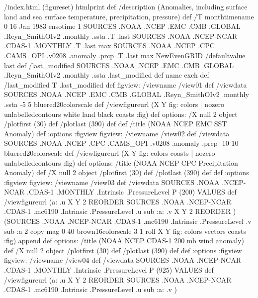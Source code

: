 \begin{ingrid}
/index.html {(figureset) htmlprint} def
/description (Anomalies, including surface land and sea surface temperature, precipitation, pressure) def
/T 
monthtimename
0
16 Jan 1983 ensotime
1
SOURCES .NOAA .NCEP .EMC .CMB .GLOBAL .Reyn_SmithOIv2 .monthly .ssta
.T .last
SOURCES .NOAA .NCEP-NCAR .CDAS-1 .MONTHLY .T .last
max
SOURCES .NOAA .NCEP .CPC .CAMS_OPI .v0208 .anomaly .prcp .T .last
max
NewEvenGRID
/defaultvalue last def
/last_modified
SOURCES .NOAA .NCEP .EMC .CMB .GLOBAL .Reyn_SmithOIv2 .monthly .ssta
.last_modified def
name exch def
/last_modified T .last_modified def
figview:
/viewname /view01 def
/viewdata SOURCES .NOAA .NCEP .EMC .CMB .GLOBAL .Reyn_SmithOIv2 .monthly .ssta
-5 5 bluered20colorscale
def
/viewfigureurl (X Y fig: colors | nozero unlabelledcontours white land black coasts :fig) def
options:
/X null 2 object
/plotfirst (30) def
/plotlast (390) def
def
/title (NOAA NCEP EMC SST Anomaly) def
:options
:figview
figview:
/viewname /view02 def
/viewdata 
SOURCES .NOAA .NCEP .CPC .CAMS_OPI .v0208 .anomaly .prcp
-10 10 bluered20colorscale
  def
/viewfigureurl (X Y fig: colors coasts | nozero unlabelledcontours :fig) def
options:
/title (NOAA NCEP CPC Precipitation Anomaly) def
/X null 2 object
/plotfirst (30) def
/plotlast (390) def
def
:options
:figview
figview:
/viewname /view03 def
/viewdata  SOURCES .NOAA .NCEP-NCAR .CDAS-1 .MONTHLY .Intrinsic .PressureLevel
  P (200) VALUES
  def
/viewfigureurl (a: .u X Y 2 REORDER SOURCES .NOAA .NCEP-NCAR .CDAS-1 .mc6190 .Intrinsic .PressureLevel .u sub :a: .v X Y 2 REORDER )
(SOURCES .NOAA .NCEP-NCAR .CDAS-1 .mc6190 .Intrinsic .PressureLevel .v sub :a 2 copy  mag 0 40 brown16colorscale 3 1 roll X Y fig: colors vectors coasts :fig) append def
options:
/title (NOAA NCEP CDAS-1 200 mb wind anomaly) def
/X null 2 object
/plotfirst (30) def
/plotlast (390) def
def
:options
:figview
figview:
/viewname /view04 def
/viewdata  SOURCES .NOAA .NCEP-NCAR .CDAS-1 .MONTHLY .Intrinsic .PressureLevel
  P (925) VALUES
  def
/viewfigureurl (a: .u X Y 2 REORDER SOURCES .NOAA .NCEP-NCAR .CDAS-1 .mc6190 .Intrinsic .PressureLevel .u sub :a: .v )

\end{ingrid}

